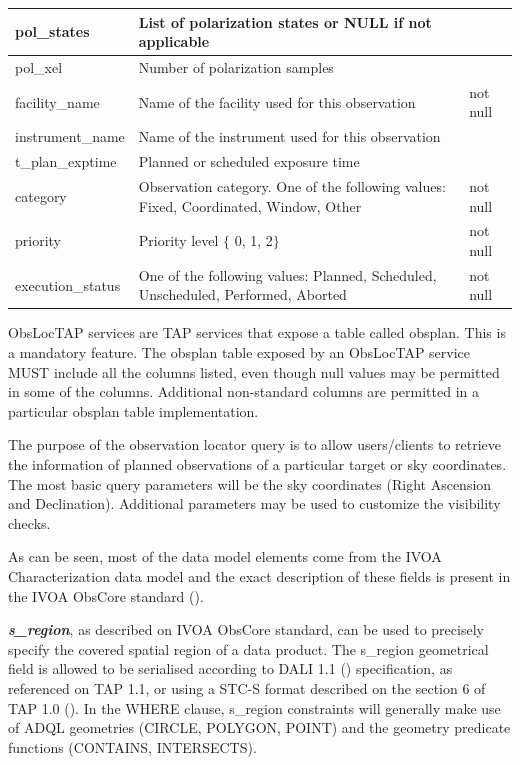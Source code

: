 \documentclass[11pt,a4paper]{ivoa}
\begin{document}
\begin{landscape}
\begin{table}
\begin{tabular}{ |l|l|l| }
\hline
pol\_states &
List of polarization states or NULL if not applicable &
\\
\hline
pol\_xel &
Number of polarization samples &
\\
\hline
facility\_name &
Name of the facility used for this observation &
not null\\
\hline
instrument\_name &
Name of the instrument used for this observation &
\\
\hline
t\_plan\_exptime &
Planned or scheduled exposure time &
\\
\hline
category &
Observation category. One of the following values: Fixed, Coordinated, Window, 
Other &
not null\\
\hline
priority &
Priority level $ \{ $ 0, 1, 2$ \} $ &
not null\\
\hline
execution\_status &
One of the following values:  Planned, Scheduled, Unscheduled, Performed, Aborted &
not null\\
\hline
\end{tabular}
\end{table}
\end{landscape}

ObsLocTAP services are TAP services that expose a table called obsplan. This
is a mandatory feature. The obsplan table exposed by an ObsLocTAP service MUST
include all  the columns listed, even though null values may be permitted in
some of the columns. Additional non-standard columns are permitted in a 
particular obsplan table implementation.

The purpose of the observation locator query is to allow users/clients to
retrieve the information of planned observations of a particular target or
sky coordinates. The most basic query parameters will be the sky coordinates
(Right Ascension and Declination). Additional parameters may be used to
customize the visibility checks.

As can be seen, most of the data model elements come from the IVOA
Characterization data model and the exact description of these fields is
present in the IVOA ObsCore standard (\citealt{2017ivoa.spec.0509L}).

\textbf{\textit{s\_region}}, as described on IVOA ObsCore standard, can be
used to precisely specify the covered spatial region of a data product. The
s\_region geometrical field is allowed to be serialised according to DALI 1.1
(\citealt{std:DALI11}) specification, as referenced on TAP 1.1, or using a STC-S format described on the section 6 of TAP 1.0 
(\citealt{2011ivoa.spec.1028T}). In the WHERE clause, s\_region constraints will generally make use of ADQL geometries (CIRCLE, POLYGON, POINT) and the geometry predicate functions (CONTAINS, INTERSECTS).
\end{document}
